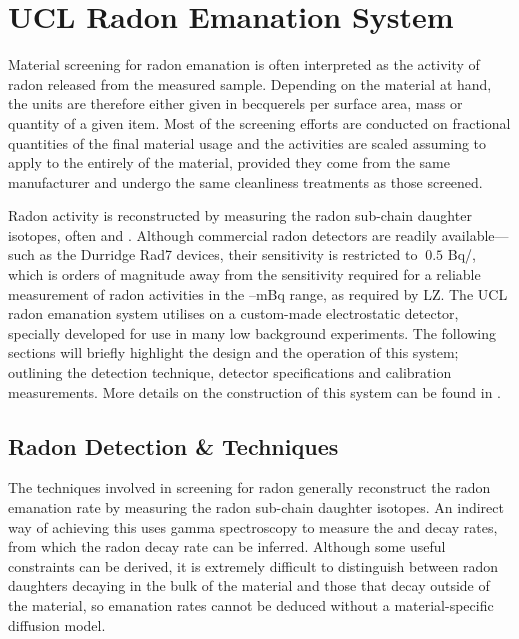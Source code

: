 


\section{UCL Radon Emanation System}
\label{sec:ucl_radon_system}

Material screening for radon emanation is often interpreted as the activity of radon released from the measured sample. Depending on the material at hand, the units are therefore either given in becquerels per surface area, mass or quantity of a given item. Most of the screening efforts are conducted on fractional quantities of the final material usage and the activities are scaled assuming to apply to the entirely of the material, provided they come from the same manufacturer and undergo the same cleanliness treatments as those screened.

Radon activity is reconstructed by measuring the radon sub-chain daughter isotopes, often \PoTOE{} and \PoTOF{}. Although commercial radon detectors are readily available---such as the Durridge Rad7 devices, their sensitivity is restricted to $~0.5$ Bq/\cubicmeter{}, which is orders of magnitude away from the sensitivity required for a reliable measurement of radon activities in the --mBq range, as required by LZ. The UCL radon emanation system utilises on a custom-made electrostatic detector, specially developed for use in many low background experiments. The following sections will briefly highlight the design and the operation of this system; outlining the detection technique, detector specifications and calibration measurements. More details on the construction of this system can be found in \cite{mott_2013, xin_2017}.


\subsection{Radon Detection \& Techniques}
\label{secsec:rn_detection_techniques}

The techniques involved in screening for radon generally reconstruct the radon emanation rate by measuring the radon sub-chain daughter isotopes. An indirect way of achieving this uses gamma spectroscopy to measure the \BiTOF{} and \PbTOF{} decay rates, from which the radon decay rate can be inferred. Although some useful constraints can be derived, it is extremely difficult to distinguish between radon daughters decaying in the bulk of the material and those that decay outside of the material, so emanation rates cannot be deduced without a material-specific diffusion model.

